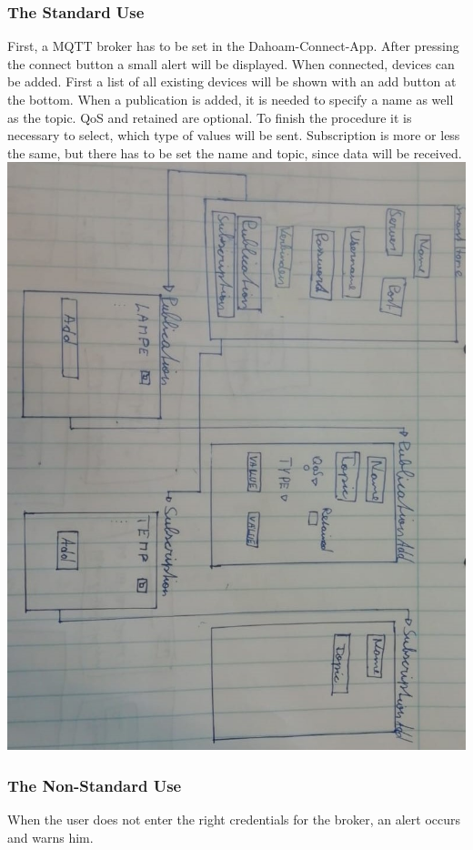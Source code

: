 \documentclass[12pt]{article}
\theoremstyle{definition}
\begin{document}
\subsubsection{The Standard Use}
First, a MQTT broker has to be set in the Dahoam-Connect-App. After pressing the connect button a small alert will be displayed. When connected, devices can be added. First a list of all existing devices will be shown with an add button at the bottom. When a publication is added, it is needed to specify a name as well as the topic. QoS and retained are optional. To finish the procedure it is necessary to select, which type of values will be sent. Subscription is more or less the same, but there has to be set the name and topic, since data will be received.\\

\includegraphics[angle=90, scale=.5]{UseCase/InstallSmartHomeInterfaces.jpeg}\\

\subsubsection{The Non-Standard Use}
When the user does not enter the right credentials for the broker, an alert occurs and warns him.
\end{document}
